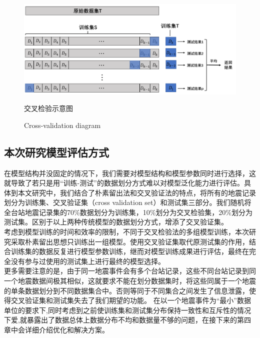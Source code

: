  \begin{figure}[!h] 
\centering 
 \includegraphics[width=0.95\linewidth]{img/cv.jpg} 
 \renewcommand{\figurename}{图} 
\caption{交叉检验示意图} 
\addtocounter{figure}{-1} \vspace{-5pt} 
\renewcommand{\figurename}{Fig} 
\caption{Cross-validation diagram} 
\renewcommand{\figurename}{图} 
\label{fig:network-device-influence.png} 
\end{figure}
 
\subsection{本次研究模型评估方式}
\indent 在模型结构并没固定的情况下，我们需要对模型结构和模型参数同时进行选择，这就导致了若只是用“训练-测试”的数据划分方式难以对模型泛化能力进行评估。具体到本文研究中，我们结合了朴素留出法和交叉验证法的特点，将所有的地震记录划分为训练集、交叉验证集（cross validation set）和测试集三部分。我们随机将全台站地震记录集的70\%数据划分为训练集，10\%划分为交叉检验集，20\%划分为测试集。区别于以上两种传统模型的数据划分方式，增添了交叉验证集。\\
\indent 考虑到模型训练的时间和效率的限制，不同于交叉检验法的多组模型训练，本次研究采取朴素留出思想只训练出一组模型。使用交叉验证集取代原测试集的作用，结合训练集的数据反复进行模型参数训练，继而对模型训练成果进行评估，最终在完全没有参与过使用的测试集上进行最终的模型选择。\\
\indent 更多需要注意的是，由于同一地震事件会有多个台站记录，这些不同台站记录到同一个地震数据间极其相似，这就要求不能在划分数据集时，将这些同属于一个地震的单条数据划分到不同数据集合中。否则等同于不同集合之间发生了信息泄露，使得交叉验证集和测试集失去了我们期望的功能。
\indent 在以一个地震事件为“最小”数据单位的要求下,同时考虑到之前使训练集和测试集分布保持一致性和互斥性的情况下爱,就暴露出了数据总体上数据分布不均和数据量不够的问题，在接下来的第四章中会详细介绍优化和解决方案。